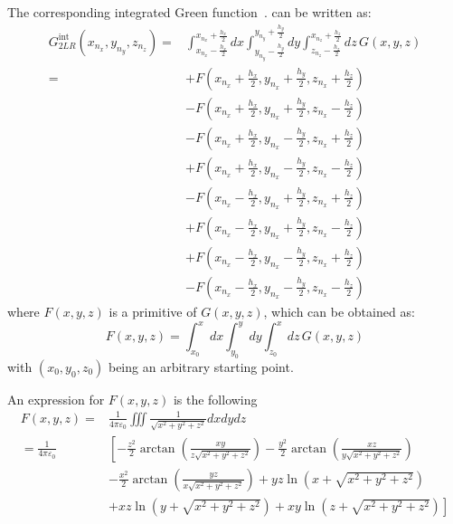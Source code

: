 The corresponding integrated Green function~\cite{QIANG2004278}. can be written as:
\begin{align}
G_{2LR}^\text{int}(x_{n_x}, y_{n_y}, z_{n_z}) =& 
\int_{x_{n_x}-\frac{h_x}{2}}^{x_{n_x}+\frac{h_x}{2}} dx
\int_{y_{n_y}-\frac{h_y}{2}}^{y_{n_y}+\frac{h_y}{2}} dy
\int_{z_{n_z}-\frac{h_z}{2}}^{x_{n_z}+\frac{h_z}{2}} dz\,
G(x,y,z)\\
= &+F\left(x_{n_x}+\frac{h_x}{2}, y_{n_x}+\frac{h_y}{2}, z_{n_x}+\frac{h_z}{2}\right) \\
    &- F\left(x_{n_x}+\frac{h_x}{2}, y_{n_x}+\frac{h_y}{2}, z_{n_x}-\frac{h_z}{2}\right)\\
    &- F\left(x_{n_x}+\frac{h_x}{2}, y_{n_x}-\frac{h_y}{2}, z_{n_x}+\frac{h_z}{2}\right)\\ 
    &+ F\left(x_{n_x}+\frac{h_x}{2}, y_{n_x}-\frac{h_y}{2}, z_{n_x}-\frac{h_z}{2}\right)\\
    &-F\left(x_{n_x}-\frac{h_x}{2}, y_{n_x}+\frac{h_y}{2}, z_{n_x}+\frac{h_z}{2}\right) \\
    &+ F\left(x_{n_x}-\frac{h_x}{2}, y_{n_x}+\frac{h_y}{2}, z_{n_x}-\frac{h_z}{2}\right)\\
    &+ F\left(x_{n_x}-\frac{h_x}{2}, y_{n_x}-\frac{h_y}{2}, z_{n_x}+\frac{h_z}{2}\right)\\ 
    & - F\left(x_{n_x}-\frac{h_x}{2}, y_{n_x}-\frac{h_y}{2}, z_{n_x}-\frac{h_z}{2}\right)
\end{align}
where $F(x,y,z)$ is a primitive of $G(x,y,z)$, which can be obtained as:
\begin{equation}
F(x,y,z) = 
\int_{x_0}^{x} dx
\int_{y_0}^{y} dy
\int_{z_0}^{x} dz\,
G(x,y,z)
\end{equation}
with $(x_0, y_0, z_0)$ being an arbitrary starting point.

An expression for $F(x,y,z)$ is the following
\begin{align}
F(x,y,z) =&\frac{1}{4\pi\varepsilon_0}\iiint \frac{1}{\sqrt{x^{2}+y^{2}+z^{2}}} d x d y d z\\ 
= \frac{1}{4\pi \varepsilon_0}&\left[-\frac{z^{2}}{2} \arctan \left(\frac{x y}{z \sqrt{x^{2}+y^{2}+z^{2}}}\right)\right.
-\frac{y^{2}}{2} \arctan \left(\frac{x z}{y \sqrt{x^{2}+y^{2}+z^{2}}}\right)\\
&-\frac{x^{2}}{2} \arctan \left(\frac{y z}{x \sqrt{x^{2}+y^{2}+z^{2}}}\right) 
+y z \ln \left(x+\sqrt{x^{2}+y^{2}+z^{2}}\right)\\
&\left. +x z \ln \left(y+\sqrt{x^{2}+y^{2}+z^{2}}\right)
+x y \ln \left(z+\sqrt{x^{2}+y^{2}+z^{2}}\right)\right]
\end{align}


